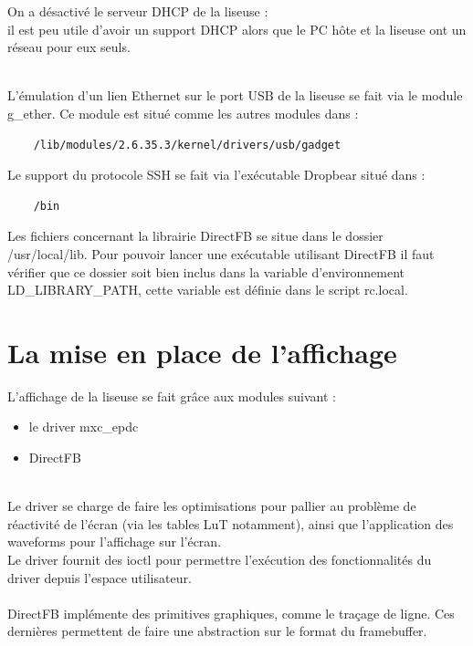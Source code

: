 On a désactivé le serveur DHCP de la liseuse : \\
		il est peu utile d'avoir un support DHCP alors que le PC hôte et la liseuse 
		ont un réseau pour eux seuls.

~\\

L'émulation d'un lien Ethernet sur le port USB de la liseuse se fait via le module g_ether.
Ce module est situé comme les autres modules dans :
	\begin{lstlisting}
	/lib/modules/2.6.35.3/kernel/drivers/usb/gadget
	\end{lstlisting}

Le support du protocole SSH se fait via l'exécutable Dropbear situé dans : 
	\begin{lstlisting}
	/bin
	\end{lstlisting}

Les fichiers concernant la librairie DirectFB se situe dans le dossier /usr/local/lib.
Pour pouvoir lancer une exécutable utilisant DirectFB il faut vérifier que ce dossier soit bien inclus dans la variable d'environnement LD_LIBRARY_PATH, cette variable est définie dans le script rc.local.
\section{La mise en place de l'affichage}

L'affichage de la liseuse se fait grâce aux modules suivant : 
\begin{itemize}
	\item le driver mxc_epdc
	\item DirectFB
\end{itemize}~\\

Le driver se charge de faire les optimisations pour pallier au problème de réactivité de l'écran (via les tables LuT notamment), ainsi que l'application des waveforms pour l'affichage sur l'écran.\\
Le driver fournit des ioctl pour permettre l'exécution des fonctionnalités du driver depuis l'espace utilisateur.~\\~\\
DirectFB implémente des primitives graphiques, comme le traçage de ligne. Ces dernières permettent de faire une abstraction sur le format du framebuffer.

